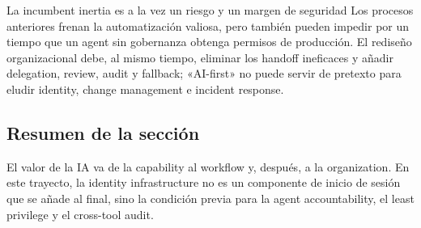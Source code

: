 
\begin{warningbox}{La incumbent inertia es a la vez un riesgo y un margen de seguridad}
Los procesos anteriores frenan la automatización valiosa, pero también pueden impedir por un tiempo que un agent sin gobernanza obtenga permisos de producción. El rediseño organizacional debe, al mismo tiempo, eliminar los handoff ineficaces y añadir delegation, review, audit y fallback; «AI-first» no puede servir de pretexto para eludir identity, change management e incident response.
\end{warningbox}

\subsection{Resumen de la sección}

El valor de la IA va de la capability al workflow y, después, a la organization. En este trayecto, la identity infrastructure no es un componente de inicio de sesión que se añade al final, sino la condición previa para la agent accountability, el least privilege y el cross-tool audit.
